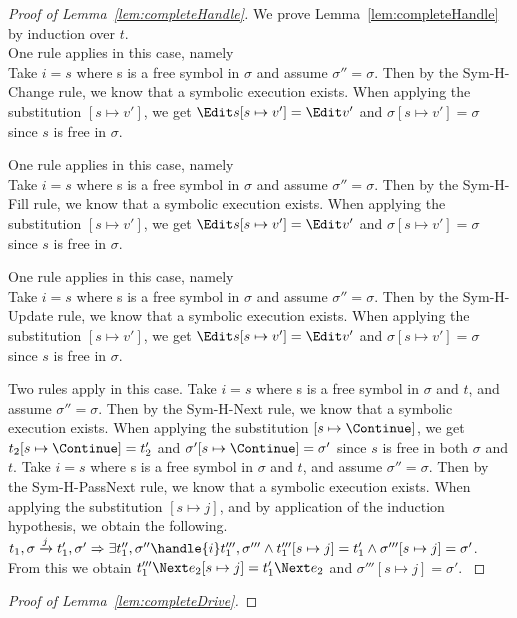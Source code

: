 \begin{proof}[Proof of Lemma~\ref{lem:completeHandle}]

  We prove Lemma~\ref{lem:completeHandle} by induction over $t$.\\

  {One rule applies in this case, namely \\
  Take $i=s$ where s is a free symbol in $\sigma$ and assume $\sigma''=\sigma$.
  Then by the Sym-H-Change rule,
  we know that a symbolic execution exists.
  When applying the substitution $[s\mapsto v']$,
  we get $\Edit s[s\mapsto v'] = \Edit v'$ and $\sigma[s\mapsto v']=\sigma$ since $s$ is free in $\sigma$.
  }

  {One rule applies in this case, namely \\
  Take $i=s$ where s is a free symbol in $\sigma$ and assume $\sigma''=\sigma$.
  Then by the Sym-H-Fill rule,
  we know that a symbolic execution exists.
  When applying the substitution $[s\mapsto v']$,
  we get $\Edit s[s\mapsto v'] = \Edit v'$ and $\sigma[s\mapsto v']=\sigma$ since $s$ is free in $\sigma$. }

  {One rule applies in this case, namely \\
  Take $i=s$ where s is a free symbol in $\sigma$ and assume $\sigma''=\sigma$.
  Then by the Sym-H-Update rule,
  we know that a symbolic execution exists.
  When applying the substitution $[s\mapsto v']$,
  we get $\Edit s[s\mapsto v'] = \Edit v'$ and $\sigma[s\mapsto v']=\sigma$ since $s$ is free in $\sigma$. }

  {Two rules apply in this case.
    {
    Take $i=s$ where s is a free symbol in $\sigma$ and $t$, and assume $\sigma''=\sigma$.
    Then by the Sym-H-Next rule,
    we know that a symbolic execution exists.
    When applying the substitution $[s\mapsto \Continue]$,
    we get $t_2[s\mapsto \Continue] = t_2'$ and $\sigma'[s\mapsto \Continue]=\sigma'$ since $s$ is free in both $\sigma$ and $t$.
    }
    {
    Take $i=s$ where s is a free symbol in $\sigma$ and $t$, and assume $\sigma''=\sigma$.
    Then by the Sym-H-PassNext rule,
    we know that a symbolic execution exists.
    When applying the substitution $[s\mapsto j]$, and by application of the induction hypothesis, we obtain the following.\\
    $t_1,\sigma\xrightarrow[]{j}t_1',\sigma'\implies \exists t_1'',\sigma''\handle{i}t_1''',\sigma'''\land t_1'''[s\mapsto j] = t_1'\land \sigma'''[s\mapsto j]=\sigma'$.\\
    From this we obtain $t_1'''\Next e_2[s\mapsto j] = t_1'\Next e_2$ and $\sigma'''[s\mapsto j]=\sigma'$.
    }
  }



\end{proof}



\begin{proof}[Proof of Lemma~\ref{lem:completeDrive}]
\end{proof}
